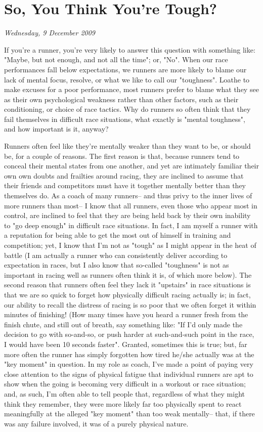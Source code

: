\chapter{So, You Think You're Tough?}
\textit{Wednesday, 9 December 2009}
\bigskip

If you're a runner, you're very likely to answer this question with something like: "Maybe, but not enough, and not all the time"; or, "No". When our race performances fall below expectations, we runners are more likely to blame our lack of mental focus, resolve, or what we like to call our "toughness". Loathe to make excuses for a poor performance, most runners prefer to blame what they see as their own psychological weakness rather than other factors, such as their conditioning, or choice of race tactics. Why do runners so often think that they fail themselves in difficult race situations, what exactly is "mental toughness", and how important is it, anyway?

Runners often feel like they're mentally weaker than they want to be, or should be, for a couple of reasons. The first reason is that, because runners tend to conceal their mental states from one another, and yet are intimately familiar their own own doubts and frailties around racing, they are inclined to assume that their friends and competitors must have it together mentally better than they themselves do. As a coach of many runners-- and thus privy to the inner lives of more runners than most-- I know that all runners, even those who appear most in control, are inclined to feel that they are being held back by their own inability to "go deep enough" in difficult race situations. In fact, I am myself a runner with a reputation for being able to get the most out of himself in training and competition; yet, I know that I'm not as "tough" as I might appear in the heat of battle (I am actually a runner who can consistently deliver according to expectation in races, but I also know that so-called "toughness" is not as important in racing well as runners often think it is, of which more below). The second reason that runners often feel they lack it "upstairs" in race situations is that we are so quick to forget how physically difficult racing actually is; in fact, our ability to recall the distress of racing is so poor that we often forget it within minutes of finishing! (How many times have you heard a runner fresh from the finish chute, and still out of breath, say something like: "If I'd only made the decision to go with so-and-so, or push harder at such-and-such point in the race, I would have been 10 seconds faster". Granted, sometimes this is true; but, far more often the runner has simply forgotten how tired he/she actually was at the "key moment" in question. In my role as coach, I've made a point of paying very close attention to the signs of physical fatigue that individual runners are apt to show when the going is becoming very difficult in a workout or race situation; and, as such, I'm often able to tell people that, regardless of what they might think they remember, they were more likely far too physically spent to react meaningfully at the alleged "key moment" than too weak mentally-- that, if there was any failure involved, it was of a purely physical nature.

